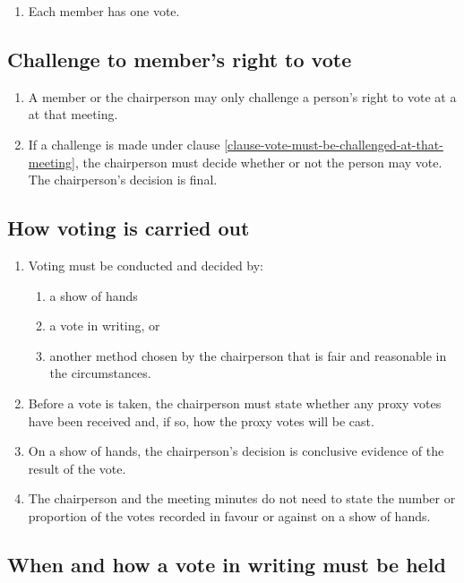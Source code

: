 \documentclass[a4paper]{article}
\let\emph\relax
\begin{document}
\begin{enumerate}
\item Each member has one vote.
\end{enumerate}

\subsection{Challenge to member's right to vote}

\begin{enumerate}
\item A member or the chairperson may only challenge a person's right to vote at a \emph{general meeting} at that meeting.\label{clause-vote-must-be-challenged-at-that-meeting}
\item If a challenge is made under clause \ref{clause-vote-must-be-challenged-at-that-meeting}, the chairperson must decide whether or not the person may vote. The chairperson's decision is final.
\end{enumerate}

\subsection{How voting is carried out}

\begin{enumerate}
\item Voting must be conducted and decided by:
    \begin{enumerate}
    \item a show of hands
    \item a vote in writing, or
    \item another method chosen by the chairperson that is fair and reasonable in the circumstances.
    \end{enumerate}
\item Before a vote is taken, the chairperson must state whether any proxy votes have been received and, if so, how the proxy votes will be cast.
\item On a show of hands, the chairperson's decision is conclusive evidence of the result of the vote.
\item The chairperson and the meeting minutes do not need to state the number or proportion of the votes recorded in favour or against on a show of hands.
\end{enumerate}

\subsection{When and how a vote in writing must be held}
\end{document}
